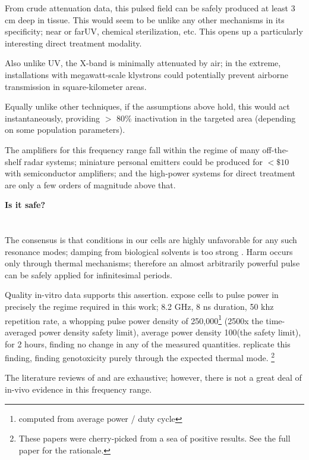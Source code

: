 \documentclass[fleqn,10pt]{paper}
\begin{document}
From crude attenuation data, this pulsed field can be safely produced at least 3 cm deep in tissue. This would seem to be unlike any other mechanisms in its specificity; near or far\cite{Germicidal2017}UV, chemical sterilization, etc. This opens up a particularly interesting direct treatment modality.

Also unlike UV, the X-band is minimally attenuated by air; in the extreme, installations with megawatt-scale klystrons could potentially prevent airborne transmission in square-kilometer areas.

Equally unlike other techniques, if the assumptions above hold, this would act instantaneously, providing $>$ 80\% inactivation in the targeted area (depending on some population parameters).

The amplifiers for this frequency range fall within the regime of many off-the-shelf radar systems; miniature personal emitters could be produced for $ < \$10$ with semiconductor amplifiers; and the high-power systems for direct treatment are only a few orders of magnitude above that.

{\Large \textbf{Is it safe?}}


\section{}


The consensus is that conditions in our cells are highly unfavorable for any such resonance modes; damping from biological solvents is too strong \cite{Vibrational2002}. Harm occurs only through thermal mechanisms; therefore an almost arbitrarily powerful pulse can be safely applied for infinitesimal periods.

Quality in-vitro data supports this assertion. \cite{Cytogenetic2006} expose cells to pulse power in precisely the regime required in this work; 8.2 GHz, 8 ns duration, 50 khz repetition rate, a whopping pulse power density of 250,000\Wsqm\footnote{computed from average power / duty cycle} (2500x the time-averaged power density safety limit), average power density 100\Wsqm (the safety limit), for 2 hours, finding no change in any of the measured quantities. \cite{DNA2004} replicate this finding, finding genotoxicity purely through the expected thermal mode. \footnote{These papers were cherry-picked from a sea of positive results. See the full paper for the rationale.}

The literature reviews of \cite{ICNIRP2020} and \cite{C95} are exhaustive; however, there is not a great deal of in-vivo evidence in this frequency range\cite{New2019}\cite{Comprehensive2018}.
\end{document}
